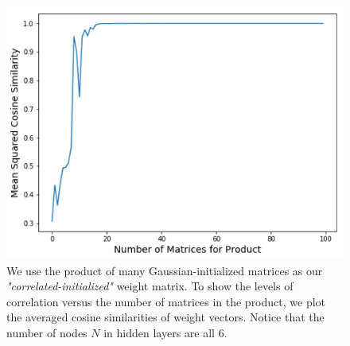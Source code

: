 \begin{figure}
    \begin{minipage}[c]{0.4\textwidth}
        \caption{We use the product of many Gaussian-initialized matrices as our \textit{"correlated-initialized"} weight matrix. To show the levels of correlation versus the number of matrices in the product, we plot the averaged cosine similarities of weight vectors. Notice that the number of nodes $N$ in hidden layers are all 6.}
        \label{fig:sec3_sim1}
    \end{minipage}\hfill
    \begin{minipage}[c]{0.5\textwidth}
        \includegraphics[width=\textwidth]{CorrelatedInitialization}
    \end{minipage}
\end{figure}